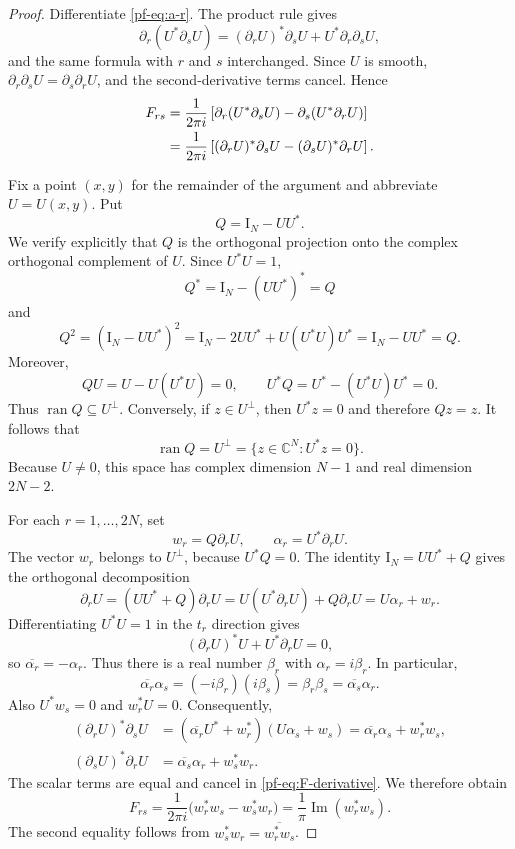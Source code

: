 \documentclass[11pt,reqno]{amsart}
\numberwithin{equation}{section}
\theoremstyle{definition}
\theoremstyle{remark}
\newcommand{\C}{\mathbb C}
\newcommand{\Id}{\mathrm I}
\begin{document}
\begin{proof}
Differentiate \eqref{pf-eq:a-r}.  The product rule gives
\[
 \partial_r(U^*\partial_sU)
 = (\partial_rU)^*\partial_sU+U^*\partial_r\partial_sU,
\]
and the same formula with $r$ and $s$ interchanged.  Since $U$ is smooth,
$\partial_r\partial_sU=\partial_s\partial_rU$, and the second-derivative
terms cancel.  Hence
\begin{align}
 F_{rs}
 &=\frac{1}{2\pi i}
 \left[
 \partial_r(U^*\partial_sU)-\partial_s(U^*\partial_rU)
 \right]\notag\\
 &=\frac{1}{2\pi i}
 \left[
 (\partial_rU)^*\partial_sU-(\partial_sU)^*\partial_rU
 \right].
 \label{pf-eq:F-derivative}
\end{align}

Fix a point $(x,y)$ for the remainder of the argument and abbreviate
$U=U(x,y)$.  Put
\begin{equation}\label{pf-eq:Q-def}
 Q=\Id_N-UU^*.
\end{equation}
We verify explicitly that $Q$ is the orthogonal projection onto the complex
orthogonal complement of $U$.  Since $U^*U=1$,
\[
 Q^*=\Id_N-(UU^*)^*=Q
\]
and
\[
 Q^2=(\Id_N-UU^*)^2
 =\Id_N-2UU^*+U(U^*U)U^*
 =\Id_N-UU^*=Q.
\]
Moreover,
\[
 QU=U-U(U^*U)=0,
 \qquad
 U^*Q=U^*-(U^*U)U^*=0.
\]
Thus $\operatorname{ran}Q\subseteq U^\perp$.  Conversely, if $z\in U^\perp$,
then $U^*z=0$ and therefore $Qz=z$.  It follows that
\[
 \operatorname{ran}Q=U^\perp
 =\{z\in\C^N:U^*z=0\}.
\]
Because $U\ne0$, this space has complex dimension $N-1$ and real dimension
$2N-2$.

For each $r=1,\ldots,2N$, set
\begin{equation}\label{pf-eq:w-r}
 w_r=Q\partial_rU,
 \qquad
 \alpha_r=U^*\partial_rU.
\end{equation}
The vector $w_r$ belongs to $U^\perp$, because $U^*Q=0$.  The identity
$\Id_N=UU^*+Q$ gives the orthogonal decomposition
\[
 \partial_rU
 =(UU^*+Q)\partial_rU
 =U(U^*\partial_rU)+Q\partial_rU
 =U\alpha_r+w_r.
\]
Differentiating $U^*U=1$ in the $t_r$ direction gives
\[
 (\partial_rU)^*U+U^*\partial_rU=0,
\]
so $\overline{\alpha_r}=-\alpha_r$.  Thus there is a real number
$\beta_r$ with $\alpha_r=i\beta_r$.  In particular,
\[
 \overline{\alpha_r}\alpha_s
 =(-i\beta_r)(i\beta_s)=\beta_r\beta_s
 =\overline{\alpha_s}\alpha_r.
\]
Also $U^*w_s=0$ and $w_r^*U=0$.  Consequently,
\begin{align*}
 (\partial_rU)^*\partial_sU
 &=(\overline{\alpha_r}U^*+w_r^*)
   (U\alpha_s+w_s)
   =\overline{\alpha_r}\alpha_s+w_r^*w_s,\\
 (\partial_sU)^*\partial_rU
 &=\overline{\alpha_s}\alpha_r+w_s^*w_r.
\end{align*}
The scalar terms are equal and cancel in \eqref{pf-eq:F-derivative}.  We
therefore obtain
\begin{equation}\label{pf-eq:F-w}
 F_{rs}
 =\frac{1}{2\pi i}\bigl(w_r^*w_s-w_s^*w_r\bigr)
 =\frac{1}{\pi}\operatorname{Im}(w_r^*w_s).
\end{equation}
The second equality follows from
$w_s^*w_r=\overline{w_r^*w_s}$.


\end{proof}
\end{document}
